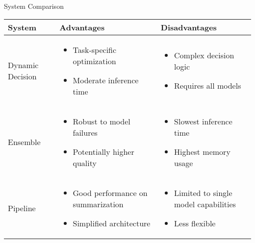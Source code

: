 \documentclass{beamer}
\begin{document}
\begin{frame}{System Comparison}
\begin{table}
\centering
\footnotesize %
\begin{tabular}{@{}p{}p{}p{}@{}} %
\toprule
\textbf{System} & \textbf{Advantages} & \textbf{Disadvantages} \\
\midrule
Dynamic Decision &
\begin{itemize}\setlength{\itemsep}{0pt}\setlength{\parskip}{0pt}\setlength{\parsep}{0pt}
    \item Task-specific optimization
    \item Moderate inference time
\end{itemize} &
\begin{itemize}\setlength{\itemsep}{0pt}\setlength{\parskip}{0pt}\setlength{\parsep}{0pt}
    \item Complex decision logic
    \item Requires all models
\end{itemize} \\
\midrule
Ensemble &
\begin{itemize}\setlength{\itemsep}{0pt}\setlength{\parskip}{0pt}\setlength{\parsep}{0pt}
    \item Robust to model failures
    \item Potentially higher quality
\end{itemize} &
\begin{itemize}\setlength{\itemsep}{0pt}\setlength{\parskip}{0pt}\setlength{\parsep}{0pt}
    \item Slowest inference time
    \item Highest memory usage
\end{itemize} \\
\midrule
Pipeline &
\begin{itemize}\setlength{\itemsep}{0pt}\setlength{\parskip}{0pt}\setlength{\parsep}{0pt}
    \item Good performance on summarization
    \item Simplified architecture
\end{itemize} &
\begin{itemize}\setlength{\itemsep}{0pt}\setlength{\parskip}{0pt}\setlength{\parsep}{0pt}
    \item Limited to single model capabilities
    \item Less flexible
\end{itemize} \\

\end{tabular}
\end{table}
\end{frame}
\end{document}
